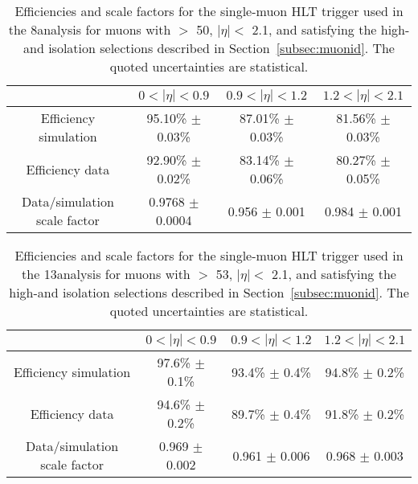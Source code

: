 \begin{table}[!htb]
\centering
\caption{Efficiencies and scale factors for the single-muon HLT trigger used in the 8\TeV analysis
for muons with \pt $>$ 50\GeV, $|\eta| <$ 2.1, and satisfying the high-\pt and isolation selections described in Section~\ref{subsec:muonid}.
The quoted uncertainties are statistical.}
\begin{tabular}{ c | c | c | c}
 & $0 < |\eta| < 0.9$ & $0.9 < |\eta| < 1.2$ & $1.2 < |\eta| < 2.1$\\
\hline
\hline
Efficiency simulation & 95.10\% $\pm$ 0.03\% & 87.01\% $\pm$ 0.03\% & 81.56\% $\pm$ 0.03\%\\
Efficiency data & 92.90\% $\pm$ 0.02\% & 83.14\% $\pm$ 0.06\% & 80.27\% $\pm$ 0.05\%\\
Data/simulation scale factor & 0.9768 $\pm$ 0.0004 & 0.956 $\pm$ 0.001 & 0.984 $\pm$ 0.001\\
\hline 
\end{tabular}
\label{tab:hltMueff8TeV}
\end{table}

\begin{table}[!htb]
\centering
\caption{Efficiencies and scale factors for the single-muon HLT trigger used in the 13\TeV analysis
for muons with \pt $>$ 53\GeV, $|\eta| <$ 2.1, and satisfying the high-\pt and isolation selections described in Section~\ref{subsec:muonid}.
The quoted uncertainties are statistical.}
\begin{tabular}{ c | c | c | c}
 & $0 < |\eta| < 0.9$ & $0.9 < |\eta| < 1.2$ & $1.2 < |\eta| < 2.1$\\
\hline
\hline
Efficiency simulation & 97.6\% $\pm$ 0.1\% & 93.4\% $\pm$ 0.4\% & 94.8\% $\pm$ 0.2\%\\
Efficiency data & 94.6\% $\pm$ 0.2\% & 89.7\% $\pm$ 0.4\% & 91.8\% $\pm$ 0.2\%\\
Data/simulation scale factor & 0.969 $\pm$ 0.002 & 0.961 $\pm$ 0.006 & 0.968 $\pm$ 0.003\\
\hline 
\end{tabular}
\label{tab:hltMueff13TeV}
\end{table}

